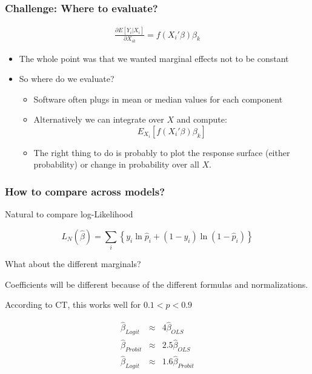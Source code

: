 \begin{frame}
       \frametitle{Challenge: Where to evaluate?}
       \begin{eqnarray*}
       \frac{\partial E[Y_i | X_i] }{\partial X_{ik}} = f (X_i'\beta) \beta_k
       \end{eqnarray*}
       \begin{itemize}
       \item The whole point was that we wanted marginal effects not to be constant
       \item So where do we evaluate?
       \begin{itemize}
       \item Software often plugs in mean or median values for each component
       \item Alternatively we can integrate over $X$ and compute:
       $$
       E_{X_i}[ f (X_i'\beta) \beta_k]
       $$
       \item The right thing to do is probably to plot the response surface (either probability) or change in probability over all $X$.
       \end{itemize}
       \end{itemize}
\end{frame}

\begin{frame}
       \frametitle{How to compare across models?}

       Natural to compare log-Likelihood

       $$ L_N(\hat \beta) = \sum_i \left\{ y_i \ln \hat p_i + (1- y_i) \ln (1 - \hat p_i) \right\} $$

       \pause 
       What about the different marginals?
       
       \medskip
       Coefficients will be different because of the different formulas and normalizations. 
       
       \medskip
       According to CT, this works well for $0.1 < p < 0.9$

       \begin{eqnarray*}
              \hat \beta_{Logit} &\approx& 4 \hat \beta_{OLS} \\
              \hat \beta_{Probit} &\approx& 2.5 \hat \beta_{OLS} \\
              \hat \beta_{Logit} &\approx& 1.6 \hat \beta_{Probit}
       \end{eqnarray*}
\end{frame}


